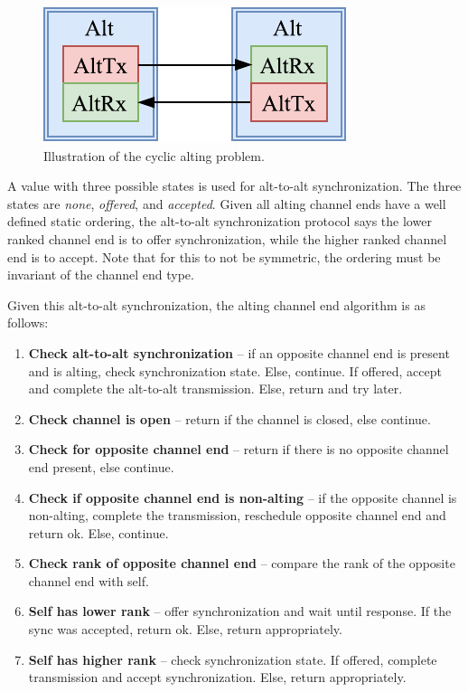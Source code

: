 \begin{figure}[h!]
    \centering
    \includegraphics[width=0.6\linewidth]{fig/alting_problem}
    \caption{Illustration of the cyclic alting problem.}
    \label{fig:alting_problem}
\end{figure}

A value with three possible states is used for alt\hyp{}to\hyp{}alt synchronization. The three states are \textit{none}, \textit{offered}, and \textit{accepted}. Given all alting channel ends have a well defined static ordering, the alt\hyp{}to\hyp{}alt synchronization protocol says the lower ranked channel end is to offer synchronization, while the higher ranked channel end is to accept. Note that for this to not be symmetric, the ordering must be invariant of the channel end type.

Given this alt\hyp{}to\hyp{}alt synchronization, the alting channel end algorithm is as follows:

\begin{enumerate}[topsep=0em,itemsep=-1em,partopsep=0.5em,parsep=1em]
    \item \textbf{Check alt\hyp{}to\hyp{}alt synchronization} -- if an opposite channel end is present and is alting, check synchronization state. Else, continue. If offered, accept and complete the alt\hyp{}to\hyp{}alt transmission. Else, return and try later.
    \label{step:check_alt_sync}
    \item \textbf{Check channel is open} -- return if the channel is closed, else continue.
    \item \textbf{Check for opposite channel end} -- return if there is no opposite channel end present, else continue.
    \item \textbf{Check if opposite channel end is non\hyp{}alting} -- if the opposite channel is non\hyp{}alting, complete the transmission, reschedule opposite channel end and return ok. Else, continue.
    \label{step:opposite_side_nonalting}
    \item \textbf{Check rank of opposite channel end} -- compare the rank of the opposite channel end with self.
    \item \textbf{Self has lower rank} -- offer synchronization and wait until response. If the sync was accepted, return ok. Else, return appropriately.
    \label{step:self_lower_rank}
    \item \textbf{Self has higher rank} -- check synchronization state. If offered, complete transmission and accept synchronization. Else, return appropriately.
    \label{step:self_higher_rank}
\end{enumerate}

